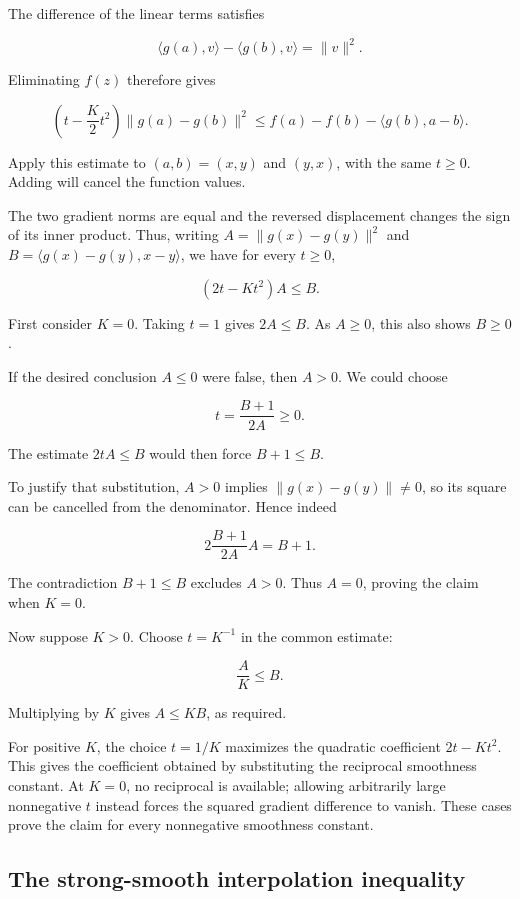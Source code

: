 \documentclass[11pt,a4paper]{report}
\begin{document}
The difference of the linear terms satisfies

\[\langle g(a),v\rangle-\langle g(b),v\rangle=\|v\|^2.\]

Eliminating \(f(z)\) therefore gives

\[\left(t-\frac K2t^2\right)\|g(a)-g(b)\|^2\le f(a)-f(b)-\langle g(b),a-b\rangle.\]

Apply this estimate to \((a,b)=(x,y)\) and \((y,x)\), with the same \(t\ge0\). Adding will cancel the function values.



The two gradient norms are equal and the reversed displacement changes the sign of its inner product. Thus, writing \(A=\|g(x)-g(y)\|^2\) and \(B=\langle g(x)-g(y),x-y\rangle\), we have for every \(t\ge0\),

\[(2t-Kt^2)A\le B.\]

First consider \(K=0\). Taking \(t=1\) gives \(2A\le B\). As \(A\ge0\), this also shows \(B\ge0\).



If the desired conclusion \(A\le0\) were false, then \(A>0\). We could choose

\[t=\frac{B+1}{2A}\ge0.\]

The estimate \(2tA\le B\) would then force \(B+1\le B\).



To justify that substitution, \(A>0\) implies \(\|g(x)-g(y)\|\ne0\), so its square can be cancelled from the denominator. Hence indeed

\[2\frac{B+1}{2A}A=B+1.\]

The contradiction \(B+1\le B\) excludes \(A>0\). Thus \(A=0\), proving the claim when \(K=0\).



Now suppose \(K>0\). Choose \(t=K^{-1}\) in the common estimate:

\[\frac AK\le B.\]

Multiplying by \(K\) gives \(A\le KB\), as required.



For positive \(K\), the choice \(t=1/K\) maximizes the quadratic coefficient \(2t-Kt^2\). This gives the coefficient obtained by substituting the reciprocal smoothness constant. At \(K=0\), no reciprocal is available; allowing arbitrarily large nonnegative \(t\) instead forces the squared gradient difference to vanish. These cases prove the claim for every nonnegative smoothness constant.

\subsection{\texorpdfstring{The strong-smooth interpolation inequality}{The strong-smooth interpolation inequality}}
\label{report-step-UnadjustedLangevin-SharpContraction-lean-2}
\end{document}
